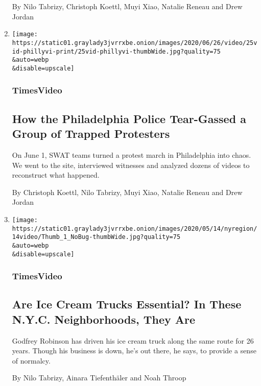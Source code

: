 \begin{enumerate}
  By Nilo Tabrizy, Christoph Koettl, Muyi Xiao, Natalie Reneau and Drew
  Jordan
\item
  \href{/video/us/100000007174941/philadelphia-tear-gas-george-floyd-protests.html}{}

  \texttt{[image: https://static01.graylady3jvrrxbe.onion/images/2020/06/26/video/25vid-phillyvi-print/25vid-phillyvi-thumbWide.jpg?quality=75\\\&auto=webp\\\&disable=upscale]}

  \hypertarget{timesvideo-7}{%
  \subsubsection{TimesVideo}\label{timesvideo-7}}

  \hypertarget{how-the-philadelphia-police-tear-gassed-a-group-of-trapped-protesters}{%
  \subsection{How the Philadelphia Police Tear-Gassed a Group of Trapped
  Protesters}\label{how-the-philadelphia-police-tear-gassed-a-group-of-trapped-protesters}}

  On June 1, SWAT teams turned a protest march in Philadelphia into
  chaos. We went to the site, interviewed witnesses and analyzed dozens
  of videos to reconstruct what happened.

  By Christoph Koettl, Nilo Tabrizy, Muyi Xiao, Natalie Reneau and Drew
  Jordan
\item
  \href{/video/nyregion/100000007125223/coronavirus-ice-cream-truck.html}{}

  \texttt{[image: https://static01.graylady3jvrrxbe.onion/images/2020/05/14/nyregion/14video/Thumb\_1\_NoBug-thumbWide.jpg?quality=75\\\&auto=webp\\\&disable=upscale]}

  \hypertarget{timesvideo-8}{%
  \subsubsection{TimesVideo}\label{timesvideo-8}}

  \hypertarget{are-ice-cream-trucks-essential-in-these-nyc-neighborhoods-they-are}{%
  \subsection{Are Ice Cream Trucks Essential? In These N.Y.C.
  Neighborhoods, They
  Are}\label{are-ice-cream-trucks-essential-in-these-nyc-neighborhoods-they-are}}

  Godfrey Robinson has driven his ice cream truck along the same route
  for 26 years. Though his business is down, he's out there, he says, to
  provide a sense of normalcy.

  By Nilo Tabrizy, Ainara Tiefenthäler and Noah Throop
\end{enumerate}

